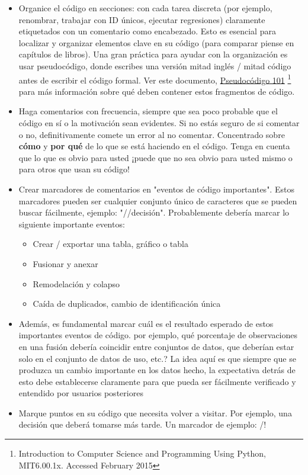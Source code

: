 \documentclass[11pt,en]{elegantpaper}
\begin{document}
\begin{itemize}
	\item Organice el código en secciones: con cada tarea discreta (por ejemplo, renombrar, trabajar con ID únicos, ejecutar                       regresiones) claramente etiquetados con un comentario como encabezado. Esto es esencial para localizar y organizar 		      elementos clave en su código (para comparar piense en capítulos de libros). Una gran práctica para ayudar con la 			      organización es usar pseudocódigo, donde escribes una versión mitad inglés / mitad código antes de escribir el código 		      formal. Ver este documento, \href{http://courses.edx.org/c4x/MITx/6.00.1x/asset/files_ps04_files_WhyPseudocode.pdf}{Pseudocódigo 101} \footnote{Introduction to Computer Science and Programming Using Python, MIT6.00.1x. Accessed February 2015}  para                 más información sobre qué deben contener estos fragmentos de código.
	\item Haga comentarios con frecuencia, siempre que sea poco probable que el código en sí o la motivación sean evidentes.	               Si no estás seguro de si comentar o no, definitivamente comete un error al no comentar. Concentrado sobre \textbf{cómo} y               \textbf{por qué} de lo que se está haciendo en el código. Tenga en cuenta que lo que es obvio para usted ¡puede que no sea               obvio para usted mismo o para otros que usan su código!
	\item Crear marcadores de comentarios en "eventos de código importantes". Estos marcadores pueden ser cualquier conjunto único                 de caracteres que se pueden buscar fácilmente, ejemplo: "//decisión". Probablemente debería marcar lo siguiente importante               eventos:
		\begin{itemize}
			\item Crear / exportar una tabla, gráfico o tabla
			\item Fusionar y anexar
			\item Remodelación y colapso
			\item Caída de duplicados, cambio de identificación única
		\end{itemize}
	\item Además, es fundamental marcar cuál es el resultado esperado de estos importantes eventos de código. por ejemplo, qué 	 	       porcentaje de observaciones en una fusión debería coincidir entre conjuntos de datos, que deberían estar solo en el                     conjunto de datos de uso, etc.? La idea aquí es que siempre que se produzca un cambio importante en los datos hecho, la                 expectativa detrás de esto debe establecerse claramente para que pueda ser fácilmente verificado y entendido por usuarios               posteriores
	\item Marque puntos en su código que necesita volver a visitar. Por ejemplo, una decisión que deberá tomarse más tarde. Un                     marcador de ejemplo: /!\
\end{itemize}
\end{document}
